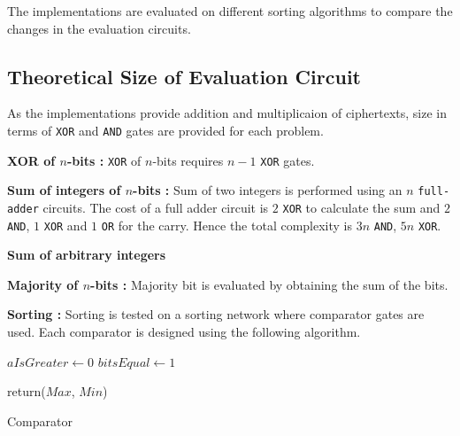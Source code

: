 \documentclass{acm_proc_article-sp}
\begin{document}
The implementations are evaluated on different sorting algorithms to compare the changes in the evaluation circuits.

\subsection{Theoretical Size of Evaluation Circuit}
As the implementations provide addition and multiplicaion of ciphertexts,  size in terms of \texttt{XOR} and \texttt{AND} gates are provided for each problem. 

\textbf{XOR of $n$-bits :} \texttt{XOR} of $n$-bits requires $n-1$ \texttt{XOR} gates. 

\textbf{Sum of integers of $n$-bits :} Sum of two integers is performed using an $n$ \texttt{full-adder} circuits. The cost of a full adder circuit is $2$ \texttt{XOR} to calculate the sum and $2$ \texttt{AND}, $1$ \texttt{XOR} and $1$ \texttt{OR} for the carry. Hence the total complexity is $3n$ \texttt{AND}, $5n$ \texttt{XOR}. 

\textbf{Sum of arbitrary integers}

\textbf{Majority of $n$-bits :} Majority bit is evaluated by obtaining the sum of the bits.

\textbf{Sorting :}
Sorting is tested on a sorting network where comparator gates are used. Each comparator is designed using the following algorithm. 


\linesnumbered

\begin{algorithm}[H]

 \SetVline



 $aIsGreater \leftarrow 0$\;
 $bitsEqual \leftarrow 1$\;

	




return($Max$, $Min$)

 \caption{Comparator\label{Code:algo}}

\end{algorithm}
\end{document}
